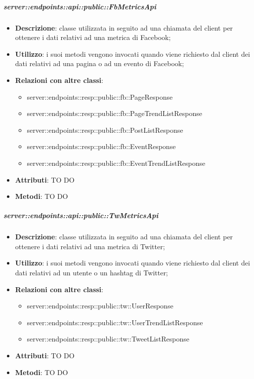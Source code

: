     \subparagraph{server::endpoints::api::public::FbMetricsApi} %
    \label{subp:bdsm_app_server_endpoints_api_public_fbmetricsapi}
    \begin{itemize}
      \item \textbf{Descrizione}: classe utilizzata in seguito ad una chiamata del client per ottenere i dati relativi ad una metrica di Facebook;
      \item \textbf{Utilizzo}: i suoi metodi vengono invocati quando viene richiesto dal client dei dati relativi ad una pagina o ad un evento di Facebook;
      \item \textbf{Relazioni con altre classi}:
        \begin{itemize}
          \item server::endpoints::resp::public::fb::PageResponse
          \item server::endpoints::resp::public::fb::PageTrendListResponse
          \item server::endpoints::resp::public::fb::PostListResponse
          \item server::endpoints::resp::public::fb::EventResponse
          \item server::endpoints::resp::public::fb::EventTrendListResponse
        \end{itemize}
		\item \textbf{Attributi}: TO DO
		\item \textbf{Metodi}: TO DO
      \end{itemize}

    \subparagraph{server::endpoints::api::public::TwMetricsApi} %
    \label{subp:bdsm_app_server_endpoints_api_public_twmetricsapi}
    \begin{itemize}
      \item \textbf{Descrizione}: classe utilizzata in seguito ad una chiamata del client per ottenere i dati relativi ad una metrica di Twitter;
      \item \textbf{Utilizzo}: i suoi metodi vengono invocati quando viene richiesto dal client dei dati relativi ad un utente o un hashtag di Twitter;
      \item \textbf{Relazioni con altre classi}:
        \begin{itemize}
          \item server::endpoints::resp::public::tw::UserResponse
          \item server::endpoints::resp::public::tw::UserTrendListResponse
          \item server::endpoints::resp::public::tw::TweetListResponse
        \end{itemize}
		\item \textbf{Attributi}: TO DO
		\item \textbf{Metodi}: TO DO
      \end{itemize}

